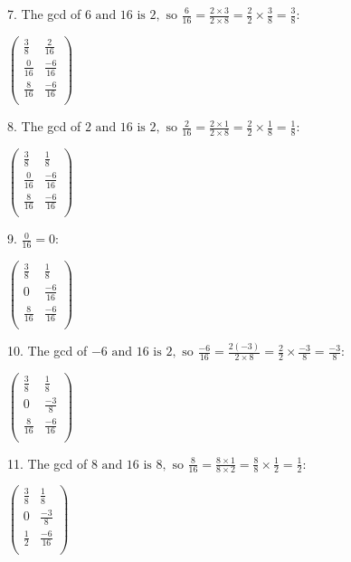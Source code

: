 \documentclass{article}
\begin{document}
7. The gcd of $6\text{ and 16 is }2,\text{ so }\frac{6}{16}=\frac{2\times 3}{2\times 8}=\frac{2}{2}\times \frac{3}{8}=\frac{3}{8}$:

$\left(
\begin{array}{cc}
\frac{3}{8} & \frac{2}{16} \\
 \frac{0}{16} & \frac{-6}{16} \\
 \frac{8}{16} & \frac{-6}{16} \\
\end{array}
\right)$

8. The gcd of $2\text{ and 16 is }2,\text{ so }\frac{2}{16}=\frac{2\times 1}{2\times 8}=\frac{2}{2}\times \frac{1}{8}=\frac{1}{8}$:

$\left(
\begin{array}{cc}
\frac{3}{8} & \frac{1}{8} \\
 \frac{0}{16} & \frac{-6}{16} \\
 \frac{8}{16} & \frac{-6}{16} \\
\end{array}
\right)$

9. $\frac{0}{16}=0:$

$\left(
\begin{array}{cc}
\frac{3}{8} & \frac{1}{8} \\
 0 & \frac{-6}{16} \\
 \frac{8}{16} & \frac{-6}{16} \\
\end{array}
\right)$

10. The gcd of $-6\text{ and 16 is }2,\text{ so }\frac{-6}{16}=\frac{2 (-3)}{2\times 8}=\frac{2}{2}\times \frac{-3}{8}=\frac{-3}{8}$:

$\left(
\begin{array}{cc}
\frac{3}{8} & \frac{1}{8} \\
 0 & \frac{-3}{8} \\
 \frac{8}{16} & \frac{-6}{16} \\
\end{array}
\right)$

11. The gcd of $8\text{ and 16 is }8,\text{ so }\frac{8}{16}=\frac{8\times 1}{8\times 2}=\frac{8}{8}\times \frac{1}{2}=\frac{1}{2}$:

$\left(
\begin{array}{cc}
\frac{3}{8} & \frac{1}{8} \\
 0 & \frac{-3}{8} \\
 \frac{1}{2} & \frac{-6}{16} \\
\end{array}
\right)$
\end{document}
